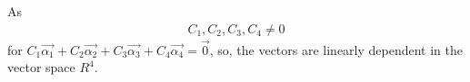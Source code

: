 \documentclass[journal,12pt,twocolumn]{IEEEtran}
\renewcommand\thesection{\arabic{section}}
\begin{document}
As 
\begin{align}
C_1, C_2, C_3, C_4 \neq 0
\end{align}
for $C_1 \vec{\alpha_1} +C_2 \vec{\alpha_2}+C_3 \vec{\alpha_3}+C_4 \vec{\alpha_4} = \vec{0}$, so, the vectors are linearly dependent in the vector space $R^4$.

\end{document}
